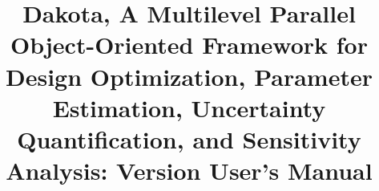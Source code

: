 \documentclass[ps2pdf,11pt,report,strict]{SANDreport}
\title{Dakota, A Multilevel Parallel Object-Oriented Framework for 
Design Optimization, Parameter Estimation, Uncertainty Quantification, 
and Sensitivity Analysis: Version \DakotaVersion\space User's Manual}
\begin{document}
\maketitle
\begin{abstract}
\DakotaAbstractShared
\DakotaAbstractUsers
\end{abstract}


\SANDmain 






\begin{SANDdistribution}[NM]





\end{SANDdistribution}

\end{document}
